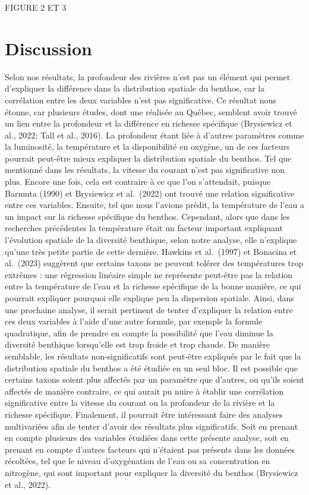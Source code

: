 \documentclass[9pt,twocolumn,twoside,]{pnas-new}
\begin{document}
FIGURE 2 ET 3

\section{Discussion}\label{discussion}

Selon nos résultats, la profondeur des rivières n'est pas un élément qui
permet d'expliquer la différence dans la distribution spatiale du
benthos, car la corrélation entre les deux variables n'est pas
significative. Ce résultat nous étonne, car plusieurs études, dont une
réalisée au Québec, semblent avoir trouvé un lien entre la profondeur et
la différence en richesse spécifique (Brysiewicz et al., 2022; Tall et
al., 2016). La profondeur étant liée à d'autres paramètres comme la
luminosité, la température et la disponibilité en oxygène, un de ces
facteurs pourrait peut-être mieux expliquer la distribution spatiale du
benthos. Tel que mentionné dans les résultats, la vitesse du courant
n'est pas significative non plus. Encore une fois, cela est contraire à
ce que l'on s'attendait, puisque Barmuta (1990) et Brysiewicz et
al.~(2022) ont trouvé une relation significative entre ces variables.
Ensuite, tel que nous l'avions prédit, la température de l'eau a un
impact sur la richesse spécifique du benthos. Cependant, alors que dans
les recherches précédentes la température était un facteur important
expliquant l'évolution spatiale de la diversité benthique, selon notre
analyse, elle n'explique qu'une très petite partie de cette dernière.
Hawkins et al.~(1997) et Bonacina et al.~(2023) suggèrent que certains
taxons ne peuvent tolérer des températures trop extrêmes : une
régression linéaire simple ne représente peut-être pas la relation entre
la température de l'eau et la richesse spécifique de la bonne manière,
ce qui pourrait expliquer pourquoi elle explique peu la dispersion
spatiale. Ainsi, dans une prochaine analyse, il serait pertinent de
tenter d'expliquer la relation entre ces deux variables à l'aide d'une
autre formule, par exemple la formule quadratique, afin de prendre en
compte la possibilité que l'eau diminue la diversité benthique
lorsqu'elle est trop froide et trop chaude. De manière semblable, les
résultats non-significatifs sont peut-être expliqués par le fait que la
distribution spatiale du benthos a été étudiée en un seul bloc. Il est
possible que certains taxons soient plus affectés par un paramètre que
d'autres, ou qu'ils soient affectés de manière contraire, ce qui aurait
pu nuire à établir une corrélation significative entre la vitesse du
courant ou la profondeur de la rivière et la richesse spécifique.
Finalement, il pourrait être intéressant faire des analyses multivariées
afin de tenter d'avoir des résultats plus significatifs. Soit en prenant
en compte plusieurs des variables étudiées dans cette présente analyse,
soit en prenant en compte d'autres facteurs qui n'étaient pas présents
dans les données récoltées, tel que le niveau d'oxygénation de l'eau ou
sa concentration en nitrogène, qui sont important pour expliquer la
diversité du benthos (Brysiewicz et al., 2022).
\end{document}
